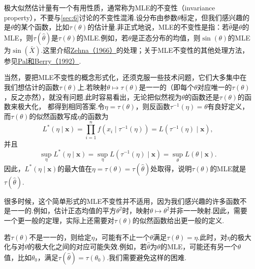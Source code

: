 极大似然估计量有一个有用性质，通常称为MLE的不变性（invariance property），不要与\autoref{sec:6}讨论的不变性混淆.设分布由参数$\theta$标定，但我们感兴趣的是$\theta$的某个函数，比如$\tau(\theta)$的估计量.非正式地说，MLE的不变性是指：若$\widehat\theta$是$\theta$的MLE，则$\tau(\widehat\theta)$是$\tau(\theta)$的MLE.例如，若$\theta$是正态分布的均值，则$\sin(\theta)$的MLE为$\sin(\bar X)$.这里介绍\hyperref[bib:source337]{Zehna（1966）}的处理；关于MLE不变性的其他处理方法，参见\hyperref[bib:source238]{Pal和Berry（1992）}.

当然，要把MLE不变性的概念形式化，还须克服一些技术问题，它们大多集中在我们想估计的函数$\tau(\theta)$上.若映射$\theta\mapsto\tau(\theta)$是一一的（即每个$\theta$对应唯一的$\tau(\theta)$，反之亦然），就没有问题.此时容易看出，无论把似然视为$\theta$的函数还是$\tau(\theta)$的函数来极大化，
都得到相同答案.令$\eta=\tau(\theta)$，则反函数$\tau^{-1}(\eta)=\theta$有良好定义，而$\tau(\theta)$的似然函数写成$\eta$的函数为
$$L^*(\eta\mid\boldsymbol x)=\prod_{i=1}^nf(x_i\mid\tau^{-1}(\eta))=L(\tau^{-1}(\eta)\mid\boldsymbol x),$$
并且
$$\sup_\eta L^*(\eta\mid\boldsymbol x)=\sup_\eta L(\tau^{-1}(\eta)\mid\boldsymbol x)=\sup_\theta L(\theta\mid\boldsymbol x).$$
因此，$L^*(\eta\mid\boldsymbol x)$的最大值在$\eta=\tau(\theta)=\tau(\widehat\theta)$处取得，说明$\tau(\theta)$的MLE就是$\tau(\widehat\theta)$.

很多时候，这个简单形式的MLE不变性并不适用，因为我们感兴趣的许多函数不是一一的.例如，估计正态均值的平方$\theta^2$时，映射$\theta\mapsto\theta^2$并非一一映射.因此，需要一个更一般的定理，实际上还需要对$\tau(\theta)$的似然函数给出更一般的定义.

若$\tau(\theta)$不是一一的，则给定$\eta$，可能有不止一个$\theta$满足$\tau(\theta)=\eta$.此时，对$\eta$的极大化与对$\theta$的极大化之间的对应可能失效.例如，若$\widehat\theta$为$\theta$的MLE，可能还有另一个$\theta$值，比如$\theta_0$，满足$\tau(\widehat\theta)=\tau(\theta_0)$.我们需要避免这样的困难.

